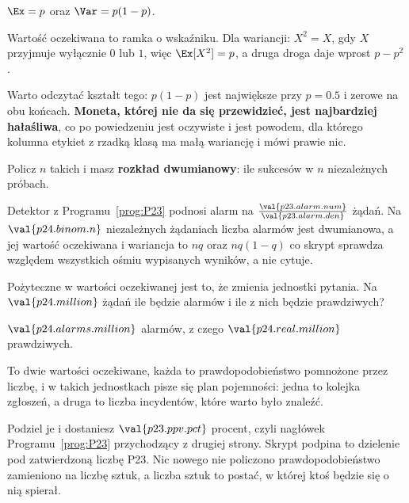 \begin{fr}
\begin{ansblock}
$\Ex = p$ oraz $\Var = p(1-p)$.
\end{ansblock}

Wartość oczekiwana to ramka o wskaźniku. Dla wariancji: $X^{2} = X$, gdy $X$
przyjmuje wyłącznie $0$ lub $1$, więc $\Ex[X^{2}] = p$, a druga droga daje
wprost $p - p^{2}$.

Warto odczytać kształt tego: $p(1-p)$ jest największe przy $p = \num{0.5}$ i
zerowe na obu końcach. \textbf{Moneta, której nie da się przewidzieć, jest
najbardziej hałaśliwa}, co po powiedzeniu jest oczywiste i jest powodem, dla
którego kolumna etykiet z rzadką klasą ma małą wariancję i mówi prawie nic.
\end{fr}

\begin{fr}
Policz $n$ takich i masz \textbf{rozkład dwumianowy}: ile sukcesów w $n$
niezależnych próbach.

Detektor z Programu~\ref{prog:P23} podnosi alarm na
$\frac{\val{p23.alarm.num}}{\val{p23.alarm.den}}$ żądań. Na
$\val{p24.binom.n}$ niezależnych żądaniach liczba alarmów jest dwumianowa, a
jej wartość oczekiwana i wariancja to $nq$ oraz $nq(1-q)$ \dash{} co skrypt
sprawdza względem wszystkich ośmiu wypisanych wyników, a nie cytuje.

Pożyteczne w wartości oczekiwanej jest to, że zmienia jednostki pytania. Na
$\val{p24.million}$ żądań ile będzie alarmów i ile z nich będzie prawdziwych?
\dotline
\nextframe
\end{fr}

\begin{fr}
\begin{ansblock}
$\val{p24.alarms.million}$ alarmów, z czego $\val{p24.real.million}$
prawdziwych.
\end{ansblock}

To dwie wartości oczekiwane, każda to prawdopodobieństwo pomnożone przez
liczbę, i w takich jednostkach pisze się plan pojemności: jedna to kolejka
zgłoszeń, a druga to liczba incydentów, które warto było znaleźć.

Podziel je i dostaniesz $\val{p23.ppv.pct}$ procent, czyli nagłówek
Programu~\ref{prog:P23} przychodzący z drugiej strony. Skrypt podpina to
dzielenie pod zatwierdzoną liczbę P23. Nic nowego nie policzono \dash{}
prawdopodobieństwo zamieniono na liczbę sztuk, a liczba sztuk to postać, w
której ktoś będzie się o nią spierał.
\end{fr}

